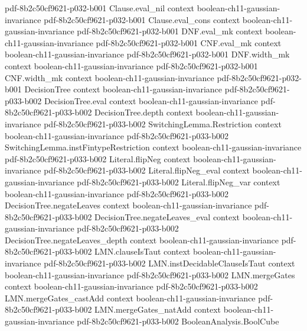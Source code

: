 \begin{theorem}
  {pdf-8b2c50cf9621-p032-b001}
\proofstep
  {Clause.eval_nil}
  {context}
  {boolean-ch11-gaussian-invariance}
  {pdf-8b2c50cf9621-p032-b001}
\proofstep
  {Clause.eval_cons}
  {context}
  {boolean-ch11-gaussian-invariance}
  {pdf-8b2c50cf9621-p032-b001}
\proofstep
  {DNF.eval_mk}
  {context}
  {boolean-ch11-gaussian-invariance}
  {pdf-8b2c50cf9621-p032-b001}
\proofstep
  {CNF.eval_mk}
  {context}
  {boolean-ch11-gaussian-invariance}
  {pdf-8b2c50cf9621-p032-b001}
\proofstep
  {DNF.width_mk}
  {context}
  {boolean-ch11-gaussian-invariance}
  {pdf-8b2c50cf9621-p032-b001}
\proofstep
  {CNF.width_mk}
  {context}
  {boolean-ch11-gaussian-invariance}
  {pdf-8b2c50cf9621-p032-b001}
\proofstep
  {DecisionTree}
  {context}
  {boolean-ch11-gaussian-invariance}
  {pdf-8b2c50cf9621-p033-b002}
\proofstep
  {DecisionTree.eval}
  {context}
  {boolean-ch11-gaussian-invariance}
  {pdf-8b2c50cf9621-p033-b002}
\proofstep
  {DecisionTree.depth}
  {context}
  {boolean-ch11-gaussian-invariance}
  {pdf-8b2c50cf9621-p033-b002}
\proofstep
  {SwitchingLemma.Restriction}
  {context}
  {boolean-ch11-gaussian-invariance}
  {pdf-8b2c50cf9621-p033-b002}
\proofstep
  {SwitchingLemma.instFintypeRestriction}
  {context}
  {boolean-ch11-gaussian-invariance}
  {pdf-8b2c50cf9621-p033-b002}
\proofstep
  {Literal.flipNeg}
  {context}
  {boolean-ch11-gaussian-invariance}
  {pdf-8b2c50cf9621-p033-b002}
\proofstep
  {Literal.flipNeg_eval}
  {context}
  {boolean-ch11-gaussian-invariance}
  {pdf-8b2c50cf9621-p033-b002}
\proofstep
  {Literal.flipNeg_var}
  {context}
  {boolean-ch11-gaussian-invariance}
  {pdf-8b2c50cf9621-p033-b002}
\proofstep
  {DecisionTree.negateLeaves}
  {context}
  {boolean-ch11-gaussian-invariance}
  {pdf-8b2c50cf9621-p033-b002}
\proofstep
  {DecisionTree.negateLeaves_eval}
  {context}
  {boolean-ch11-gaussian-invariance}
  {pdf-8b2c50cf9621-p033-b002}
\proofstep
  {DecisionTree.negateLeaves_depth}
  {context}
  {boolean-ch11-gaussian-invariance}
  {pdf-8b2c50cf9621-p033-b002}
\proofstep
  {LMN.clauseIsTaut}
  {context}
  {boolean-ch11-gaussian-invariance}
  {pdf-8b2c50cf9621-p033-b002}
\proofstep
  {LMN.instDecidableClauseIsTaut}
  {context}
  {boolean-ch11-gaussian-invariance}
  {pdf-8b2c50cf9621-p033-b002}
\proofstep
  {LMN.mergeGates}
  {context}
  {boolean-ch11-gaussian-invariance}
  {pdf-8b2c50cf9621-p033-b002}
\proofstep
  {LMN.mergeGates_castAdd}
  {context}
  {boolean-ch11-gaussian-invariance}
  {pdf-8b2c50cf9621-p033-b002}
\proofstep
  {LMN.mergeGates_natAdd}
  {context}
  {boolean-ch11-gaussian-invariance}
  {pdf-8b2c50cf9621-p033-b002}
\proofstep
  {BooleanAnalysis.BoolCube}

\end{theorem}
